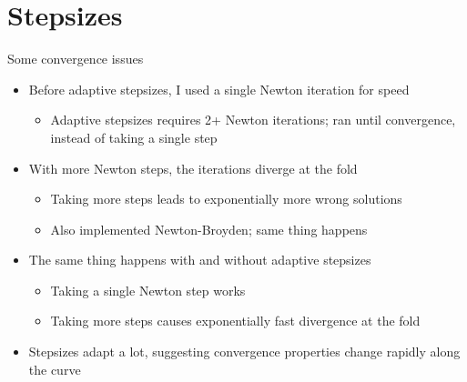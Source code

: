 \documentclass[presentation]{beamer}
\begin{document}
\section{Stepsizes}
\label{sec:orge478bc4}
\begin{frame}[label={sec:org1563e84}]{Some convergence issues}
\begin{itemize}
\item Before adaptive stepsizes, I used a single Newton iteration for speed
\begin{itemize}
\item Adaptive stepsizes requires 2+ Newton iterations; ran until convergence, instead of taking a single step
\end{itemize}
\end{itemize}
\vfill
\begin{itemize}
\item With more Newton steps, the iterations diverge at the fold
\begin{itemize}
\item Taking more steps leads to exponentially more wrong solutions
\item Also implemented Newton-Broyden; same thing happens
\end{itemize}
\end{itemize}
\vfill
\begin{itemize}
\item The same thing happens with and without adaptive stepsizes
\begin{itemize}
\item Taking a single Newton step works
\item Taking more steps causes exponentially fast divergence at the fold
\end{itemize}
\end{itemize}
\vfill
\begin{itemize}
\item Stepsizes adapt a lot, suggesting convergence properties change rapidly along the curve
\end{itemize}
\end{frame}
\end{document}
